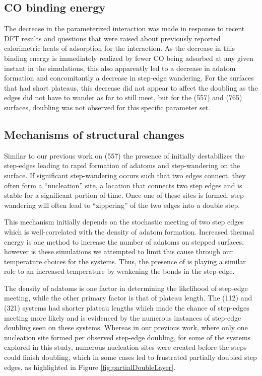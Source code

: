 \subsection{CO binding energy}
The decrease in the parameterized  interaction was made in
response to recent DFT results\citep{Deshlahra:2012aa} and questions that were
raised about previously reported calorimetric heats of adsorption for the
 interaction.\citep{Yeo:1997th} As the decrease in this binding
energy is immediately realized by fewer CO being adsorbed at any given instant
in the simulations, this also apparently led to a decrease in adatom formation
and concomitantly a decrease in step-edge wandering. For the surfaces that had
short plateaus, this decrease did not appear to affect the doubling as the
edges did not have to wander as far to still meet, but for the (557) and (765)
surfaces,  doubling was not observed for this specific parameter set.

\subsection{Mechanisms of structural changes}
Similar to our previous work on  (557) the presence of  initially
destabilizes the step-edges leading to rapid formation of adatoms and
step-wandering on the surface. If significant step-wandering occurs such that
two edges connect, they often form a ``nucleation'' site, a location that
connects two step edges and is stable for a significant portion of time. Once
one of these sites is formed, step-wandering will often lead to ``zippering''
of the two edges into a double step. 

This mechanism initially depends on the stochastic meeting of two step edges
which is well-correlated with the density of adatom formation. Increased
thermal energy is one method to increase the number of adatoms on stepped
surfaces, however is these simulations we attempted to limit this cause through
our temperature choices for the systems. Thus, the presence of  is
playing a similar role to an increased temperature by weakening the
 bonds in the step-edge.

The density of adatoms is one factor in determining the likelihood of step-edge
meeting, while the other primary factor is that of plateau length. The (112)
and (321) systems had shorter plateau lengths which made the chance of
step-edges meeting more likely and is evidenced by the numerous instances of
step-edge doubling seen on these systems. Whereas in our previous work, where
only one nucleation site formed per observed step-edge doubling, for some of
the systems explored in this study, numerous nucleation sites were created
before the steps could finish doubling, which in some cases led to
frustrated partially doubled step edges, as highlighted in Figure
\ref{fig:partialDoubleLayer}.

